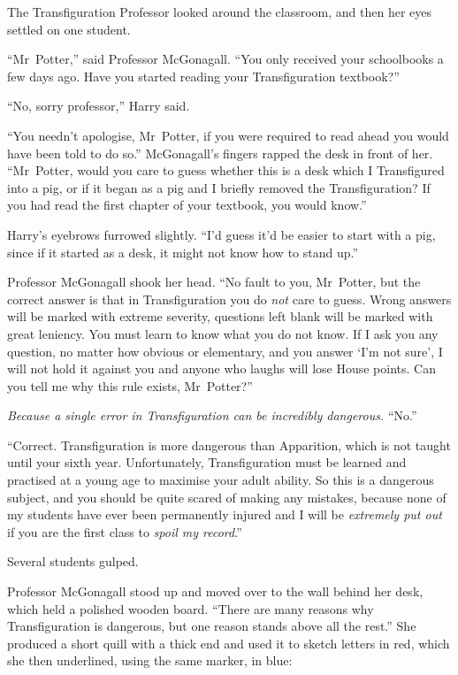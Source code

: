 The Transfiguration Professor looked around the classroom, and then her eyes settled on one student.

“Mr~Potter,” said Professor McGonagall. “You only received your schoolbooks a few days ago. Have you started reading your Transfiguration textbook?”

“No, sorry professor,” Harry said.

“You needn’t apologise, Mr~Potter, if you were required to read ahead you would have been told to do so.” McGonagall’s fingers rapped the desk in front of her. “Mr~Potter, would you care to guess whether this is a desk which I Transfigured into a pig, or if it began as a pig and I briefly removed the Transfiguration? If you had read the first chapter of your textbook, you would know.”

Harry’s eyebrows furrowed slightly. “I’d guess it’d be easier to start with a pig, since if it started as a desk, it might not know how to stand up.”

Professor McGonagall shook her head. “No fault to you, Mr~Potter, but the correct answer is that in Transfiguration you do \emph{not} care to guess. Wrong answers will be marked with extreme severity, questions left blank will be marked with great leniency. You must learn to know what you do not know. If I ask you any question, no matter how obvious or elementary, and you answer ‘I’m not sure’, I will not hold it against you and anyone who laughs will lose House points. Can you tell me why this rule exists, Mr~Potter?”

\emph{Because a single error in Transfiguration can be incredibly dangerous.} “No.”

“Correct. Transfiguration is more dangerous than Apparition, which is not taught until your sixth year. Unfortunately, Transfiguration must be learned and practised at a young age to maximise your adult ability. So this is a dangerous subject, and you should be quite scared of making any mistakes, because none of my students have ever been permanently injured and I will be \emph{extremely put out} if you are the first class to \emph{spoil my record}.”

Several students gulped.

Professor McGonagall stood up and moved over to the wall behind her desk, which held a polished wooden board. “There are many reasons why Transfiguration is dangerous, but one reason stands above all the rest.” She produced a short quill with a thick end and used it to sketch letters in red, which she then underlined, using the same marker, in blue:

